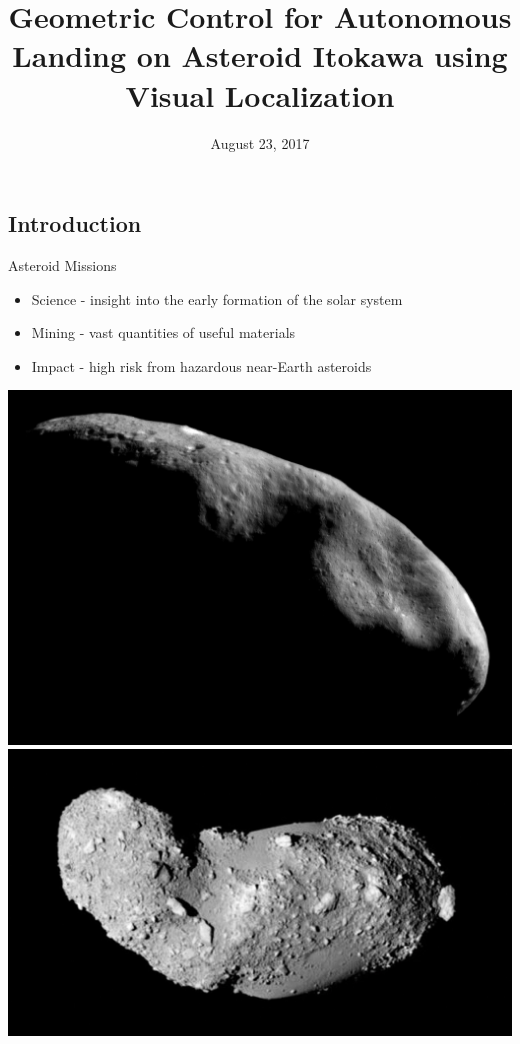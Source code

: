 \documentclass[11pt,professionalfonts]{beamer}
\title[Autonomous Landing]{\large\textbf Geometric Control for Autonomous Landing on Asteroid Itokawa using Visual Localization}
\author{\vspace*{-0.3cm}}
\institute{
	\footnotesize
	{\normalsize\bf{Shankar Kulumani, Kuya Takami \\ Taeyoung Lee}}\\
	\vspace*{0.2cm}
  	\textbf{Department of Mechanical \& Aerospace Engineering}\\ \vspace*{0.5cm}
 	\begin{figure} %
       	\texttt{[image: gw\_txh\_2cs\_pos]}
  	\end{figure}
}
\date{August 23, 2017}
\begin{document}

\setcounter{framenumber}{-1}
\begin{frame} %
  \titlepage
\end{frame}   %

\section*{}
\subsection*{Introduction}  
\begin{frame}{Asteroid Missions}
\begin{itemize}
    \item Science - insight into the early formation of the solar system
    \item Mining - vast quantities of useful materials
    \item Impact - high risk from hazardous near-Earth asteroids
\end{itemize}    

\begin{center}
    \includegraphics[height=0.35\textheight]{figures/near_mos_20001203_full.jpg}
    \hfill
    \includegraphics[height=0.35\textheight]{figures/Itokawa8_hayabusa_1210.jpg}
\end{center}
\end{frame}
\end{document}
